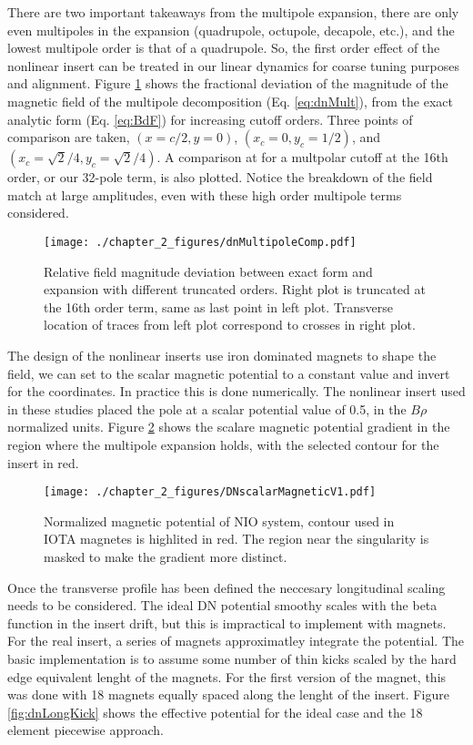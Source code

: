 There are two important takeaways from the multipole expansion, there are only even multipoles in the expansion (quadrupole, octupole, decapole, etc.), and the lowest multipole order is that of a quadrupole. So, the first order effect of the nonlinear insert can be treated in our linear dynamics for coarse tuning purposes and alignment. Figure \ref{fig:dnMultRatio} shows the fractional deviation of the magnitude of the magnetic field of the multipole decomposition (Eq. \ref{eq:dnMult}), from the exact analytic form (Eq. \ref{eq:BdF}) for increasing cutoff orders. Three points of comparison are taken, $(x=c/2,y=0)$, $(x_c=0,y_c=1/2)$, and $(x_c=\sqrt{2}/4,y_c=\sqrt{2}/4)$. A comparison at for a multpolar cutoff at the 16th order, or our 32-pole term, is also plotted. Notice the breakdown of the field match at large amplitudes, even with these high order multipole terms considered.

\begin{figure}
	\centering
	\texttt{[image: ./chapter\_2\_figures/dnMultipoleComp.pdf]}
	\caption{Relative field magnitude deviation between exact form and expansion with different truncated orders. Right plot is truncated at the 16th order term, same as last point in left plot. Transverse location of traces from left plot correspond to crosses in right plot.}
	\label{fig:dnMultRatio}
\end{figure}

The design of the nonlinear inserts use iron dominated magnets to shape the field, we can set to the scalar magnetic potential to a constant value and invert for the coordinates. In practice this is done numerically. The nonlinear insert used in these studies placed the pole at a scalar potential value of 0.5, in the $B\rho$ normalized units. Figure \ref{fig:dnMagPtCurve} shows the scalare magnetic potential gradient in the region where the multipole expansion holds, with the selected contour for the insert in red.

\begin{figure}
	\centering
	\texttt{[image: ./chapter\_2\_figures/DNscalarMagneticV1.pdf]}
	\caption{Normalized magnetic potential of NIO system, contour used in IOTA magnetes is highlited in red. The region near the singularity is masked to make the gradient more distinct.}
	\label{fig:dnMagPtCurve}
\end{figure}

Once the transverse profile has been defined the neccesary longitudinal scaling needs to be considered. The ideal DN potential smoothy scales with the beta function in the insert drift, but this is impractical to implement with magnets. For the real insert, a series of magnets approximatley integrate the potential. The basic implementation is to assume some number of thin kicks scaled by the hard edge equivalent lenght of the magnets. For the first version of the magnet, this was done with 18 magnets equally spaced along the lenght of the insert. Figure \ref{fig:dnLongKick} shows the effective potential for the ideal case and the 18 element piecewise approach. 

